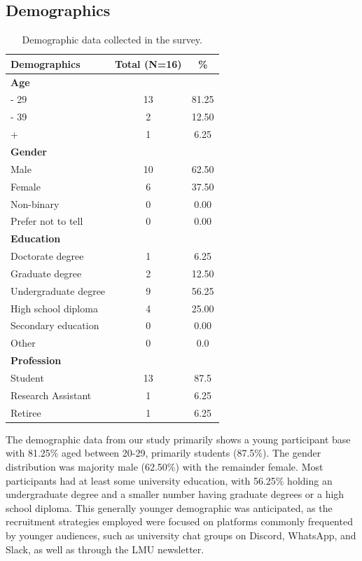 \documentclass[
  a4paper,  %
  twoside,  %
  bibliography=totoc,
  headsepline,
  cleardoublepage=empty,
  parskip=half,
  draft=false
]{scrbook}
\begin{document}
\subsection{Demographics}
\begin{table}[ht]
\centering
\begin{tabularx}{\textwidth}{Xcc}
\toprule
\textbf{Demographics} & \textbf{Total (N=16)} & \textbf{\%} \\
\midrule
\textbf{Age} \\
\quad 20 - 29 & 13 & 81.25 \\
\quad 30 - 39 & 2 & 12.50 \\
\quad 40+ & 1 & 6.25 \\
\midrule
\textbf{Gender} \\
\quad Male & 10 & 62.50 \\
\quad Female & 6 & 37.50 \\
\quad Non-binary & 0 & 0.00 \\
\quad Prefer not to tell & 0 & 0.00 \\
\midrule
\textbf{Education} \\
\quad Doctorate degree & 1 & 6.25 \\
\quad Graduate degree & 2 & 12.50 \\
\quad Undergraduate degree & 9 & 56.25 \\
\quad High school diploma & 4 & 25.00 \\
\quad Secondary education & 0 & 0.00 \\
\quad Other & 0 & 0.0 \\
\midrule
\textbf{Profession} \\
\quad Student & 13 & 87.5 \\
\quad Research Assistant & 1 & 6.25 \\
\quad Retiree & 1 & 6.25 \\
\bottomrule
\end{tabularx}
\caption{Demographic data collected in the survey.}
\end{table}

The demographic data from our study primarily shows a young participant base with 81.25\% aged between 20-29, primarily students (87.5\%). The gender distribution was majority male (62.50\%) with the remainder female. Most participants had at least some university education, with 56.25\% holding an undergraduate degree and a smaller number having graduate degrees or a high school diploma. This generally younger demographic was anticipated, as the recruitment strategies employed were focused on platforms commonly frequented by younger audiences, such as university chat groups on Discord, WhatsApp, and Slack, as well as through the LMU newsletter.
\end{document}
